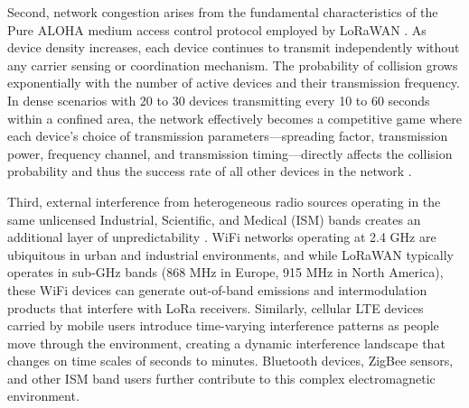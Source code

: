 \documentclass[12pt,a4paper]{article}
\begin{document}
Second, network congestion arises from the fundamental characteristics of the Pure ALOHA medium access control protocol employed by LoRaWAN \cite{georgiou2017low}. As device density increases, each device continues to transmit independently without any carrier sensing or coordination mechanism. The probability of collision grows exponentially with the number of active devices and their transmission frequency. In dense scenarios with 20 to 30 devices transmitting every 10 to 60 seconds within a confined area, the network effectively becomes a competitive game where each device's choice of transmission parameters—spreading factor, transmission power, frequency channel, and transmission timing—directly affects the collision probability and thus the success rate of all other devices in the network \cite{bankov2017should}.

Third, external interference from heterogeneous radio sources operating in the same unlicensed Industrial, Scientific, and Medical (ISM) bands creates an additional layer of unpredictability \cite{hosseinzadeh2020empirical}. WiFi networks operating at 2.4 GHz are ubiquitous in urban and industrial environments, and while LoRaWAN typically operates in sub-GHz bands (868 MHz in Europe, 915 MHz in North America), these WiFi devices can generate out-of-band emissions and intermodulation products that interfere with LoRa receivers. Similarly, cellular LTE devices carried by mobile users introduce time-varying interference patterns as people move through the environment, creating a dynamic interference landscape that changes on time scales of seconds to minutes. Bluetooth devices, ZigBee sensors, and other ISM band users further contribute to this complex electromagnetic environment.
\end{document}
